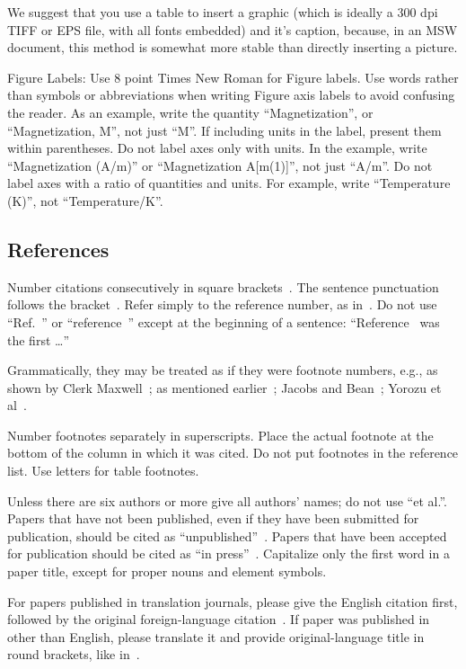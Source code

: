 \documentclass [a4paper,final,conference,10pt]{IDAACS}
\begin{document}
We suggest that you use a table to insert a graphic (which is ideally a 300 dpi
TIFF or EPS file, with all fonts embedded) and it’s caption, because, in an MSW
document, this method is somewhat more stable than directly inserting a picture.

Figure Labels: Use 8 point Times New Roman for Figure labels. Use words rather
than symbols or abbreviations when writing Figure axis labels to avoid 
confusing the reader. As an example, write the quantity ``Magnetization'', or 
``Magnetization, M'', not just ``M''. If including units in the label, present
them within parentheses. Do not label axes only with units. In the example, 
write ``Magnetization (A/m)'' or ``Magnetization {A[m(1)]}'', not just ``A/m''.
Do not label axes with a ratio of quantities and units. For example, write 
``Temperature (K)'', not ``Temperature/K''.


\subsection{References}

Number citations consecutively in square brackets~\cite{publ1}.
The sentence punctuation follows the bracket~\cite{publ2}. Refer simply to the
reference number, as in~\cite{publ3}. Do not use ``Ref.~\cite{publ3}'' or 
``reference~\cite{publ3}'' except at the beginning of a sentence: 
``Reference~\cite{publ3} was the first \ldots{}''

Grammatically, they may be treated as if they were footnote numbers, e.g., 
as shown by Clerk Maxwell~\cite{publ2}; as mentioned earlier~\cite{publ7, 
publ2, publ3, publ4, publ6}; Jacobs and Bean~\cite{publ5}; Yorozu et 
al~\cite{publ6}.

Number footnotes separately in superscripts. Place the actual footnote at the 
bottom of the column in which it was cited. Do not put footnotes in the 
reference list. Use letters for table footnotes.

Unless there are six authors or more give all authors' names; do not use 
``et al.''. Papers that have not been published, even if they have been 
submitted for publication, should be cited as ``unpublished''~\cite{publ4}. 
Papers that have been accepted for publication should be cited as 
``in press''~\cite{publ5}. Capitalize only the first word in a paper title, 
except for proper nouns and element symbols.

For papers published in translation journals, please give the English citation 
first, followed by the original foreign-language citation~\cite{publ6}. If 
paper was published in other than English, please translate it and provide
original-language title in round brackets, like in~\cite{publ8}.
\end{document}

